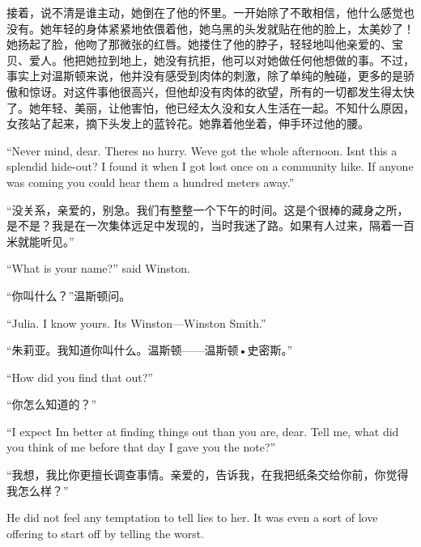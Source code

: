 \begin{paracol}{2}
\switchcolumn

接着，说不清是谁主动，她倒在了他的怀里。一开始除了不敢相信，他什么感觉也没有。她年轻的身体紧紧地依偎着他，她乌黑的头发就贴在他的脸上，太美妙了！她扬起了脸，他吻了那微张的红唇。她搂住了他的脖子，轻轻地叫他亲爱的、宝贝、爱人。他把她拉到地上，她没有抗拒，他可以对她做任何他想做的事。不过，事实上对温斯顿来说，他并没有感受到肉体的刺激，除了单纯的触碰，更多的是骄傲和惊讶。对这件事他很高兴，但他却没有肉体的欲望，所有的一切都发生得太快了。她年轻、美丽，让他害怕，他已经太久没和女人生活在一起。不知什么原因，女孩站了起来，摘下头发上的蓝铃花。她靠着他坐着，伸手环过他的腰。

\switchcolumn*

``Never mind, dear. There\textquotesingle s no hurry.
We\textquotesingle ve got the whole afternoon. Isn\textquotesingle t
this a splendid hide-out? I found it when I got lost once on a community
hike. If anyone was coming you could hear them a hundred meters away.''

\switchcolumn

``没关系，亲爱的，别急。我们有整整一个下午的时间。这是个很棒的藏身之所，是不是？我是在一次集体远足中发现的，当时我迷了路。如果有人过来，隔着一百米就能听见。''

\switchcolumn*

``What is your name?'' said Winston.

\switchcolumn

``你叫什么？''温斯顿问。

\switchcolumn*

``Julia. I know yours. It\textquotesingle s Winston---Winston Smith.''

\switchcolumn

``朱莉亚。我知道你叫什么。温斯顿——温斯顿•史密斯。''

\switchcolumn*

``How did you find that out?''

\switchcolumn

``你怎么知道的？''

\switchcolumn*

``I expect I\textquotesingle m better at finding things out than you are,
dear. Tell me, what did you think of me before that day I gave you the
note?''

\switchcolumn

``我想，我比你更擅长调查事情。亲爱的，告诉我，在我把纸条交给你前，你觉得我怎么样？''

\switchcolumn*

He did not feel any temptation to tell lies to her. It was even a sort
of love offering to start off by telling the worst.


\end{paracol}
